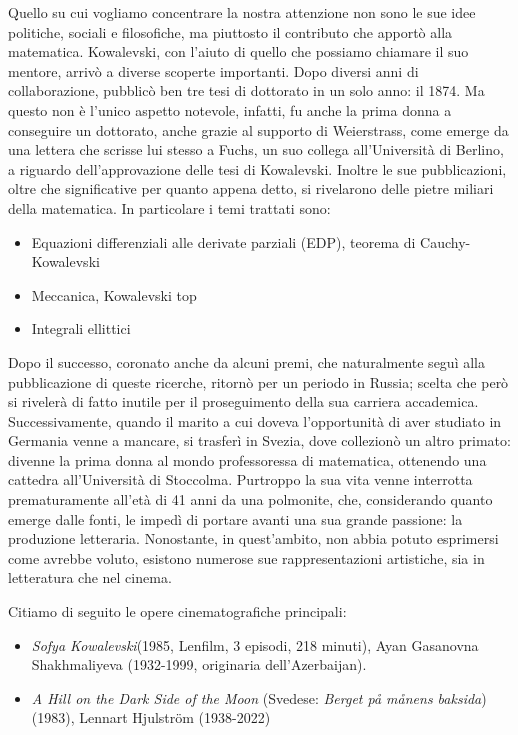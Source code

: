 Quello su cui vogliamo concentrare la nostra attenzione non sono le sue idee politiche, sociali e filosofiche, ma piuttosto il contributo che apportò alla matematica. Kowalevski, con l'aiuto di quello che possiamo chiamare il suo mentore, arrivò a diverse scoperte importanti. Dopo diversi anni di collaborazione, pubblicò ben tre tesi di dottorato in un solo anno: il 1874. Ma questo non è l'unico aspetto notevole, infatti, fu anche la prima donna a conseguire un dottorato, anche grazie al supporto di Weierstrass, come emerge da una lettera che scrisse lui stesso a Fuchs, un suo collega all'Università di Berlino, a riguardo dell'approvazione delle tesi di Kowalevski. Inoltre le sue pubblicazioni, oltre che significative per quanto appena detto, si rivelarono delle pietre miliari della matematica. In particolare i temi trattati sono:
\begin{itemize}
\item Equazioni differenziali alle derivate parziali (EDP), teorema di Cauchy-Kowalevski
\item Meccanica, Kowalevski top
\item Integrali ellittici
\end{itemize}


Dopo il successo, coronato anche da alcuni premi, che naturalmente seguì alla pubblicazione di queste ricerche, ritornò per un periodo in Russia; scelta che però si rivelerà di fatto inutile per il proseguimento della sua carriera accademica. Successivamente, quando il marito a cui doveva l'opportunità di aver studiato in Germania venne a mancare, si trasferì in Svezia, dove collezionò un altro primato: divenne la prima donna al mondo professoressa di matematica, ottenendo una cattedra all'Università di Stoccolma.
Purtroppo la sua vita venne interrotta prematuramente all'età di 41 anni da una polmonite, che, considerando quanto emerge dalle fonti, le impedì di portare avanti una sua grande passione: la produzione letteraria.
Nonostante, in quest'ambito, non abbia potuto esprimersi come avrebbe voluto, esistono numerose sue rappresentazioni artistiche, sia in letteratura che nel cinema.

Citiamo di seguito le opere cinematografiche principali:
\begin{itemize}
\emergencystretch 3em
\item \textit{Sofya Kowalevski}(1985, Lenfilm, 3 episodi, 218 minuti), Ayan Gasanovna Shakhmaliyeva (1932-1999,
originaria dell'Azerbaijan).

\item \textit{A Hill on the Dark Side of the Moon} (Svedese: \textit{Berget på månens baksida})(1983), Lennart Hjulström (1938-2022)
\end{itemize}


